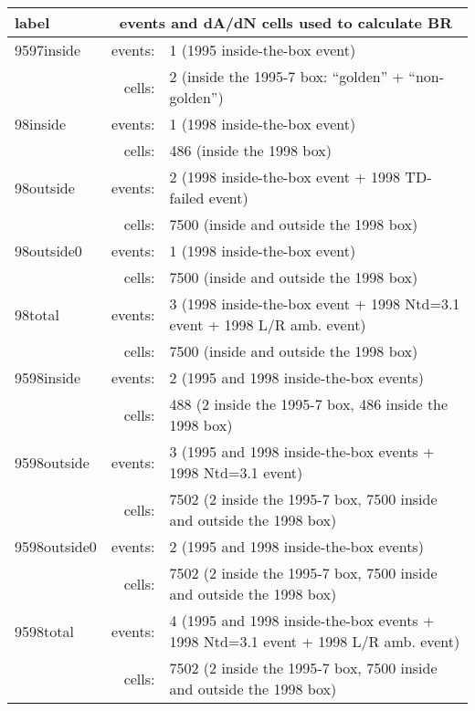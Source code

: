 \documentclass[11pt,twoside]{article}
\begin{document}
\begin{table}[t]
\begin{center}
\begin{tabular}[]{|l|rl|} 
\hline 
label & \multicolumn{2}{|c|}{events and dA/dN cells used to calculate BR} \\
\hline
\hline
9597inside   & events: & 1 (1995 inside-the-box event) \\
             & cells:  & 2 (inside the 1995-7 box:  ``golden'' + ``non-golden'') \\
\hline
98inside     & events: & 1 (1998 inside-the-box event) \\
             & cells:  & 486 (inside the 1998 box) \\
\hline
98outside    & events: & 2 (1998 inside-the-box event + 1998 TD-failed event) \\
             & cells:  & 7500 (inside and outside the 1998 box) \\
\hline
98outside0   & events: & 1 (1998 inside-the-box event) \\
             & cells:  & 7500 (inside and outside the 1998 box) \\
\hline
98total      & events: & 3 (1998 inside-the-box event + 1998 Ntd=3.1 event + 1998 L/R amb. event) \\
             & cells:  & 7500 (inside and outside the 1998 box) \\
\hline
9598inside   & events: & 2 (1995 and 1998 inside-the-box events) \\
             & cells:  & 488 (2 inside the 1995-7 box, 486 inside the 1998 box) \\
\hline
9598outside  & events: & 3 (1995 and 1998 inside-the-box events + 1998 Ntd=3.1 event) \\
             & cells:  & 7502 (2 inside the 1995-7 box, 7500 inside and outside the 1998 box) \\
\hline
9598outside0 & events: & 2 (1995 and 1998 inside-the-box events) \\
             & cells:  & 7502 (2 inside the 1995-7 box, 7500 inside and outside the 1998 box) \\
\hline
9598total    & events: & 4 (1995 and 1998 inside-the-box events + 1998 Ntd=3.1 event + 1998 L/R amb. event) \\
             & cells:  & 7502 (2 inside the 1995-7 box, 7500 inside and outside the 1998 box) \\
\hline
\hline
\end{tabular} 
\caption[]
{
   \label{t:likedesc} }
\end{center}
\end{table}
\end{document}
